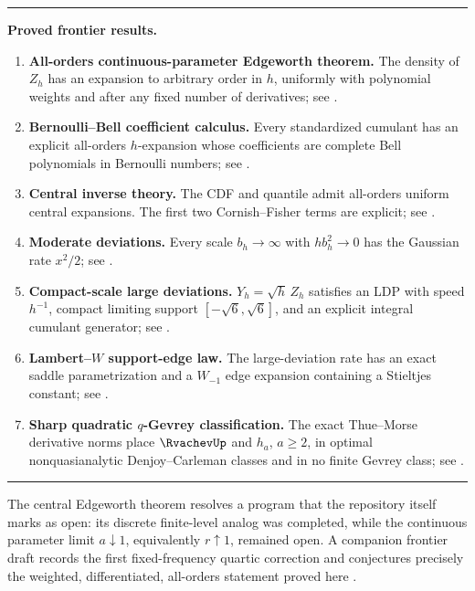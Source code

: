 \documentclass[11pt]{article}
\numberwithin{equation}{section}
\theoremstyle{definition}
\newenvironment{resultbox}{%
  \begin{center}\begin{minipage}{0.94\textwidth}%
  \setlength{\parindent}{0pt}\color{linkblue}\hrule\vspace{0.55em}\color{black}%
}{%
  \vspace{0.55em}\color{linkblue}\hrule\color{black}%
  \end{minipage}\end{center}%
}
\begin{document}
\begin{resultbox}
\textbf{Proved frontier results.}
\begin{enumerate}[label=\textup{(\Roman*)}]
\item \textbf{All-orders continuous-parameter Edgeworth theorem.}  The density of \(Z_h\) has an expansion to arbitrary order in \(h\), uniformly with polynomial weights and after any fixed number of derivatives; see .
\item \textbf{Bernoulli--Bell coefficient calculus.}  Every standardized cumulant has an explicit all-orders \(h\)-expansion whose coefficients are complete Bell polynomials in Bernoulli numbers; see .
\item \textbf{Central inverse theory.}  The CDF and quantile admit all-orders uniform central expansions.  The first two Cornish--Fisher terms are explicit; see .
\item \textbf{Moderate deviations.}  Every scale \(b_h\to\infty\) with \(hb_h^2\to0\) has the Gaussian rate \(x^2/2\); see .
\item \textbf{Compact-scale large deviations.}  \(Y_h=\sqrt h\,Z_h\) satisfies an LDP with speed \(h^{-1}\), compact limiting support \([-\sqrt6,\sqrt6]\), and an explicit integral cumulant generator; see .
\item \textbf{Lambert--\(W\) support-edge law.}  The large-deviation rate has an exact saddle parametrization and a \(W_{-1}\) edge expansion containing a Stieltjes constant; see .
\item \textbf{Sharp quadratic \(q\)-Gevrey classification.}  The exact Thue--Morse derivative norms place \(\RvachevUp\) and \(h_a\), \(a\ge2\), in optimal nonquasianalytic Denjoy--Carleman classes and in no finite Gevrey class; see .
\end{enumerate}
\end{resultbox}

The central Edgeworth theorem resolves a program that the repository itself marks as open: its discrete finite-level analog was completed, while the continuous parameter limit \(a\downarrow1\), equivalently \(r\uparrow1\), remained open.  A companion frontier draft records the first fixed-frequency quartic correction and conjectures precisely the weighted, differentiated, all-orders statement proved here \cite{RepoFrontier,RepoGaussian}.
\end{document}
